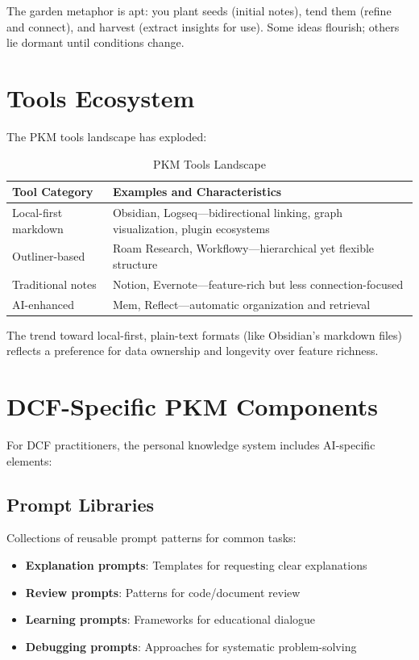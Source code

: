 The garden metaphor is apt: you plant seeds (initial notes), tend them (refine and connect), and harvest (extract insights for use). Some ideas flourish; others lie dormant until conditions change.

\section{Tools Ecosystem}

The PKM tools landscape has exploded:

\begin{table}[H]
\centering
\begin{tabular}{lp{7cm}}
\toprule
\textbf{Tool Category} & \textbf{Examples and Characteristics} \\
\midrule
Local-first markdown & Obsidian, Logseq---bidirectional linking, graph visualization, plugin ecosystems \\
Outliner-based & Roam Research, Workflowy---hierarchical yet flexible structure \\
Traditional notes & Notion, Evernote---feature-rich but less connection-focused \\
AI-enhanced & Mem, Reflect---automatic organization and retrieval \\
\bottomrule
\end{tabular}
\caption{PKM Tools Landscape}
\end{table}

The trend toward local-first, plain-text formats (like Obsidian's markdown files) reflects a preference for data ownership and longevity over feature richness.

\section{DCF-Specific PKM Components}

For DCF practitioners, the personal knowledge system includes AI-specific elements:

\subsection{Prompt Libraries}

Collections of reusable prompt patterns for common tasks:

\begin{itemize}
    \item \textbf{Explanation prompts}: Templates for requesting clear explanations
    \item \textbf{Review prompts}: Patterns for code/document review
    \item \textbf{Learning prompts}: Frameworks for educational dialogue
    \item \textbf{Debugging prompts}: Approaches for systematic problem-solving
\end{itemize}


